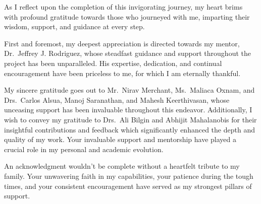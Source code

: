 As I reflect upon the completion of this invigorating journey, my heart brims with profound gratitude towards those who journeyed with me, imparting their wisdom, support, and guidance at every step.

First and foremost, my deepest appreciation is directed towards my mentor, Dr.\ Jeffrey J. Rodriguez, whose steadfast guidance and support throughout the project has been unparalleled. His expertise, dedication, and continual encouragement have been priceless to me, for which I am eternally thankful.

My sincere gratitude goes out to Mr.\ Nirav Merchant, Ms.\ Maliaca Oxnam, and Drs.\ Carlos Alsua, Manoj Saranathan, and Mahesh Keerthivasan, whose unceasing support has been invaluable throughout this endeavor. Additionally, I wish to convey my gratitude to Drs.\ Ali Bilgin and Abhijit Mahalanobis for their insightful contributions and feedback which significantly enhanced the depth and quality of my work. Your invaluable support and mentorship have played a crucial role in my personal and academic evolution.

An acknowledgment wouldn't be complete without a heartfelt tribute to my family. Your unwavering faith in my capabilities, your patience during the tough times, and your consistent encouragement have served as my strongest pillars of support.
